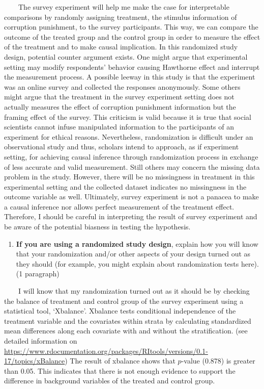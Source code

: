 \documentclass[
  11pt,
]{article}
\providecommand{\tightlist}{%
  \setlength{\itemsep}{0pt}\setlength{\parskip}{0pt}}
\begin{document}
~~~~The survey experiment will help me make the case for interpretable
comparisons by randomly assigning treatment, the stimulus information of
corruption punishment, to the survey participants. This way, we can
compare the outcome of the treated group and the control group in order
to measure the effect of the treatment and to make causal implication.
In this randomized study design, potential counter argument exists. One
might argue that experimental setting may modify respondents' behavior
causing Hawthorne effect and interrupt the measurement process. A
possible leeway in this study is that the experiment was an online
survey and collected the responses anonymously. Some others might argue
that the treatment in the survey experiment setting does not actually
measures the effect of corruption punishment information but the framing
effect of the survey. This criticism is valid because it is true that
social scientists cannot infuse manipulated information to the
participants of an experiment for ethical reasons. Nevertheless,
randomization is difficult under an observational study and thus,
scholars intend to approach, as if experiment setting, for achieving
causal inference through randomization process in exchange of less
accurate and valid measurement. Still others may concern the missing
data problem in the study. However, there will be no missingness in
treatment in this experimental setting and the collected dataset
indicates no missingness in the outcome variable as well. Ultimately,
survey experiment is not a panacea to make a causal inference nor allows
perfect measurement of the treatment effect. Therefore, I should be
careful in interpreting the result of survey experiment and be aware of
the potential biasness in testing the hypothesis.

\begin{enumerate}
\def\labelenumi{\roman{enumi}.}
\setcounter{enumi}{1}
\tightlist
\item
  \textbf{If you are using a randomized study design}, explain how you
  will know that your randomization and/or other aspects of your design
  turned out as they should (for example, you might explain about
  randomization tests here). (1 paragraph)
\end{enumerate}

~~~~I will know that my randomization turned out as it should be by
checking the balance of treatment and control group of the survey
experiment using a statistical tool, `Xbalance'. Xbalance tests
conditional independence of the treatment variable and the covariates
within strata by calculating standardized mean differences along each
covariate with and without the stratification. (see detailed information
on
\url{https://www.rdocumentation.org/packages/RItools/versions/0.1-17/topics/xBalance})
The result of xbalance shows that \(p\)-value (0.878) is greater than
0.05. This indicates that there is not enough evidence to support the
difference in background variables of the treated and control group.
\end{document}
